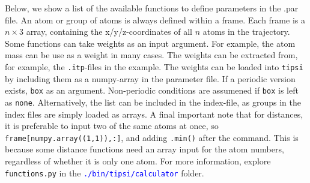 \documentclass[]{article}
\begin{document}
Below, we show a list of the available functions to define parameters in the .par file. An atom or group of atoms is always defined within a frame. 
Each frame is a $n \times 3$ array, containing the x/y/z-coordinates of all $n$ atoms in the trajectory. 
Some functions can take weights as an input argument. For example, the atom mass can be use as a weight in many cases.
The weights can be extracted from, for example, the \texttt{.itp}-files in the example.
The weights can be loaded into \texttt{tipsi} by including them as a numpy-array in the parameter file. 
If a periodic version exists, \texttt{box} as an argument. Non-periodic conditions are assumened if \texttt{box} is left as \texttt{none}.
Alternatively, the list can be included in the index-file, as groups in the index files are simply loaded as arrays.
A final important note that for distances, it is preferable to input two of the same atoms at once, so \texttt{frame[numpy.array((1,1)),:]}, and adding \texttt{.min()} after the command.
This is because some distance functions need an array input for the atom numbers, regardless of whether it is only one atom.
For more information, explore \texttt{functions.py} in the \textcolor{blue}{\texttt{./bin/tipsi/calculator}} folder.
\end{document}
